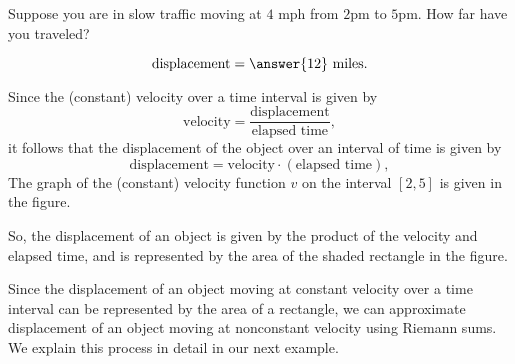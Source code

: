 \documentclass{ximera}
\begin{document}
\begin{question}
   Suppose you are in slow traffic moving at $4$ \textrm{mph} from
   $2$pm to $5$pm.  How far have you traveled?
   \begin{prompt}
     \[
     \text{displacement}= \answer{12}\ \text{miles}.
     \]
   \end{prompt}
   \begin{feedback}
     Since the (constant) velocity over a time interval is given by
     \[
     \text{velocity}=\frac{\text{displacement}}{\text{elapsed time}},
     \]
     it follows that the displacement of the object over an interval
     of time is given by
     \[
     \text{displacement}=\text{velocity}\cdot
     (\text{elapsed time}),
     \]
     The graph of the (constant) velocity function $v$ on the interval
     $[2,5]$ is given in the figure.
      \begin{image}
\end{image}

      So, the displacement of an object is given by the product of the  velocity and elapsed time, and is represented by the area of the shaded rectangle in the figure.
      \end{feedback}
\end{question}
Since the displacement of an object moving at constant velocity
over a time interval can be represented by the area of a
rectangle, we can approximate displacement of an object moving
at nonconstant velocity using Riemann sums.  We explain this
process in detail in our next example.
\end{document}
